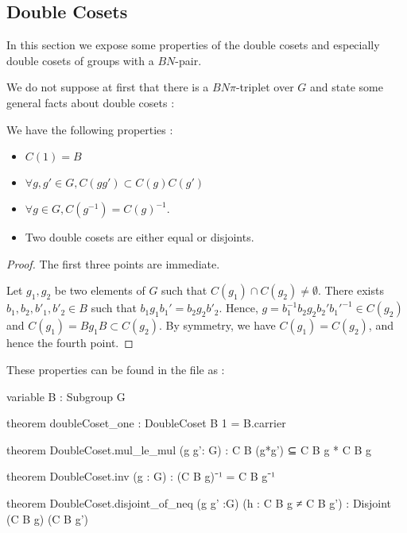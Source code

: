 \subsection{Double Cosets}
\label{sub:Double Cosets}

In this section we expose some properties of the double cosets and especially double cosets of groups with a $BN$-pair.

We do not suppose at first that there is a $BN\pi$-triplet over $G$ and state some general facts about double cosets : 

\begin{proprietes} \label{prop:DC1}
    We have the following properties :
    \begin{itemize}
        \item  $C\left( 1 \right) = B$
        \item $\forall g,g'\in G,C\left( g g' \right) \subset C(g) C(g')$
        \item $\forall g \in G, C\left( g^{-1} \right) = C\left( g \right)^{-1}$.
        \item Two double cosets are either equal or disjoints.
    \end{itemize}
\end{proprietes}

\begin{proof}
    The first three points are immediate. 

    Let $g_1, g_2$ be two elements of $G$ such that $C\left( g_1 \right) \cap C\left( g_2 \right) \neq \emptyset$. There exists $b_1, b_2, b'_1, b'_2 \in B$ such that $b_1 g_1 b_1' = b_2 g_2 b'_2 $. Hence, $g = b_1^{-1} b_2 g_2 b_2' b_1'^{-1} \in  C\left( g_2 \right) $ and $C(g_1) = Bg_1B\subset C(g_2)$. By symmetry, we have $C\left( g_1 \right) = C\left( g_2 \right)$, and hence the fourth point.
\end{proof} 

These properties can be found in the  file as :
\begin{leancode}
variable {B : Subgroup G}

theorem doubleCoset_one : DoubleCoset B 1 = B.carrier

theorem DoubleCoset.mul_le_mul (g g': G) : C B (g*g') ⊆ C B g * C B g

theorem DoubleCoset.inv (g : G) : (C B g)⁻¹ = C B g⁻¹

theorem DoubleCoset.disjoint_of_neq (g g' :G) (h : C B g ≠ C B g') : 
  Disjoint (C B g) (C B g') 
\end{leancode}

